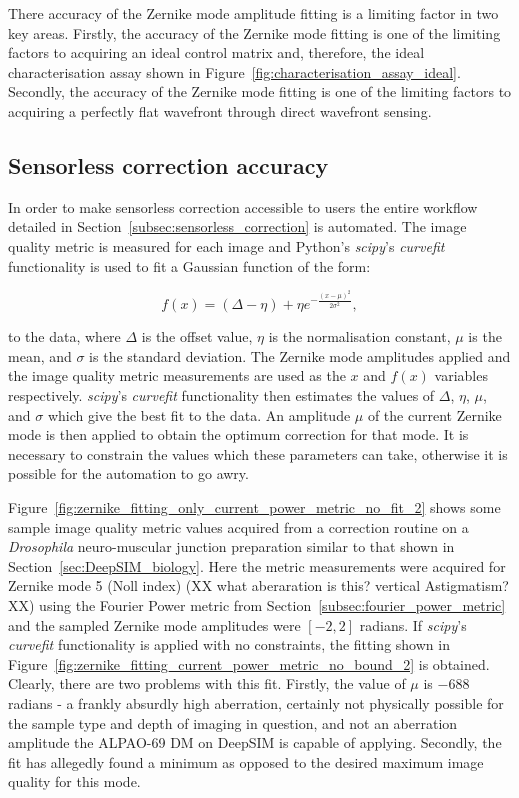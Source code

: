 There accuracy of the Zernike mode amplitude fitting is a limiting factor in two key areas. Firstly, the accuracy of the Zernike mode fitting is one of the limiting factors to acquiring an ideal control matrix and, therefore, the ideal characterisation assay shown in Figure~\ref{fig:characterisation_assay_ideal}. Secondly, the accuracy of the Zernike mode fitting is one of the limiting factors to acquiring a perfectly flat wavefront through direct wavefront sensing.

\subsection{Sensorless correction accuracy}
\label{subsec:sensorless_accuracy}

In order to make sensorless correction accessible to users the entire 
workflow detailed in Section~\ref{subsec:sensorless_correction} is 
automated. The image quality metric is measured for each image and Python's 
\textit{scipy}'s \textit{curve\textunderscore fit} 
functionality\cite{virtanen2020scipy} is used to fit a Gaussian function of 
the form:

\begin{equation}\label{eq:gaussian}
f(x) = (\Delta - \eta) + \eta e^{-\frac{\left(x-\mu\right)^{2}}{2\sigma^{2}}},
\end{equation}

to the data, where $\Delta$ is the offset value, $\eta$ is the 
normalisation constant, $\mu$ is the mean, and $\sigma$ is the standard 
deviation. The Zernike mode amplitudes applied and the image quality metric 
measurements are used as the $x$ and $f(x)$ variables respectively. 
\textit{scipy}'s \textit{curve\textunderscore fit} functionality then 
estimates the values of $\Delta$, $\eta$, $\mu$, and $\sigma$ which give 
the best fit to the data. An amplitude $\mu$ of the current Zernike mode is 
then applied to obtain the optimum correction for that mode. It is necessary to 
constrain the values which these parameters can take, otherwise it is 
possible for the automation to go awry.

Figure~\ref{fig:zernike_fitting_only_current_power_metric_no_fit_2} shows 
some sample image quality metric values acquired from a correction routine 
on a \textit{Drosophila} neuro-muscular junction preparation similar to 
that shown in Section~\ref{sec:DeepSIM_biology}. Here the metric 
measurements were acquired for Zernike mode 5 (Noll index) (XX what
aberaration is this? vertical Astigmatism? XX) using the 
Fourier Power metric from Section~\ref{subsec:fourier_power_metric} and the 
sampled Zernike mode amplitudes were $[-2,2]$ radians. If \textit{scipy}'s 
\textit{curve\textunderscore fit} functionality is applied with no 
constraints, the fitting shown in 
Figure~\ref{fig:zernike_fitting_current_power_metric_no_bound_2} is 
obtained. Clearly, there are two problems with this fit. Firstly, the value 
of $\mu$ is $-688$ radians - a frankly absurdly high aberration, certainly 
not physically possible for the sample type and depth of imaging in 
question, and not an aberration amplitude the ALPAO-69 DM on DeepSIM is 
capable of applying. Secondly, the fit has allegedly found a minimum as 
opposed to the desired maximum image quality for this mode. 

